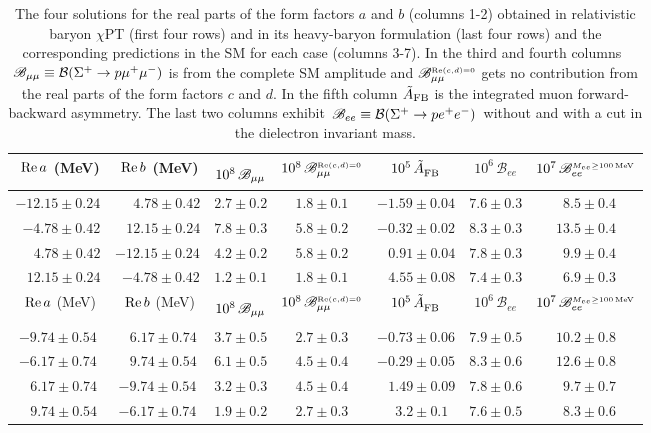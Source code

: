 \documentclass[amsmath,amssymb,aps,nofootinbib,prd,preprint,superscriptaddress,tightenlines,a4paper,bm]{revtex4-2}
\begin{document}
\begin{table}[b] \bigskip
\centering \setlength{\tabcolsep}{1ex}
\begin{tabular}{|cc||c|c|c|c|c|}\hline
$~ {\rm Re}\,a$ (MeV) & $~ {\rm Re}\,b$ (MeV) & $10^8\, {\mathscr B}_{\mu\mu}\vphantom{|_|^{\int}}$ &  $10^8\, {\mathscr B}_{\mu\mu}^{\scriptscriptstyle{\rm Re}(c,d)=0}$ & $10^5\, {\tilde A}_{\rm FB}^{}$ & $10^6\,\mathscr B_{ee}^{}$  & $10^7\, {\mathscr B}_{ee}^{\scriptscriptstyle M_{ee}\ge100\rm\,MeV}$ \\ \hline
$-12.15\pm0.24$ & ~~ $4.78\pm 0.42$ & $2.7\pm 0.2$ & $1.8\pm 0.1$ & $-1.59\pm0.04$& $7.6\pm 0.3$ & ~$8.5\pm0.4$
\\
~$-4.78\pm 0.42$ & ~ $12.15\pm0.24$ & $7.8\pm 0.3$ & $5.8\pm 0.2$ & $-0.32\pm0.02$& $8.3\pm0.3$ & $13.5\pm0.4$
\\
~~ $4.78\pm 0.42$  &  $-12.15\pm0.24$ & $4.2\pm 0.2$ & $5.8\pm 0.2$ & ~ $0.91\pm0.04$& $7.8\pm0.3$ & ~$9.9\pm0.4$
\\
~ $12.15\pm0.24$ & ~$-4.78\pm 0.42$& $1.2\pm 0.1$& $1.8\pm 0.1$ & ~ $4.55\pm0.08$& $7.4\pm0.3$ & ~$6.9\pm 0.3$
\\ \hline \hline
$~{\rm Re}\,a$ (MeV) & $~{\rm Re}\,b$ (MeV) & $10^8\, {\mathscr B}_{\mu\mu}\vphantom{|_|^{\int}}$ & $10^8\, {\mathscr B}_{\mu\mu}^{\scriptscriptstyle{\rm Re}(c,d)=0}$ & $10^5\, {\tilde A}_{\rm FB}^{}$ & $10^6\, \mathscr B_{ee}^{}$  & $10^7\, {\mathscr B}_{ee}^{\scriptscriptstyle M_{ee}\ge100\rm\,MeV}$
\\ \hline
$-9.74\pm0.54$  & ~ $6.17\pm 0.74$ & $3.7\pm 0.5$ & $2.7\pm 0.3$ & $-0.73\pm0.06$  & $7.9\pm 0.5$ & $10.2\pm0.8$
\\
$-6.17\pm 0.74$ & ~ $9.74\pm0.54$  & $6.1\pm0.5$ & $4.5\pm 0.4$  & $-0.29\pm0.05$  & $8.3\pm 0.6$ & $12.6\pm0.8$
\\
~ $6.17\pm 0.74$ &  $-9.74\pm0.54$ & $3.2\pm 0.3$& $4.5\pm 0.4$  & ~ $1.49\pm0.09$ & $7.8\pm 0.6$ & ~$9.7\pm0.7$
\\
~ $9.74\pm0.54$ & $-6.17\pm 0.74$  & $1.9\pm 0.2$ & $2.7\pm 0.3$ & ~ $3.2\pm0.1$   & $7.6\pm 0.5$ & ~$8.3\pm0.6$
\\ \hline
    \end{tabular}
\caption{The four solutions for the real parts of the form factors $a$ and $b$ (columns 1-2) obtained in relativistic baryon $\chi$PT (first four rows) and in its heavy-baryon formulation (last four rows) and the corresponding predictions in the SM for each case (columns 3-7).
In the third and fourth columns \,$\mathscr B_{\mu\mu}\equiv{\cal B}(\Sigma^+\to p\mu^+\mu^-)$ is from the complete SM amplitude and ${\mathscr B}_{\mu\mu}^{\scriptscriptstyle{\rm Re}(c,d)=0}$ gets no contribution from the real parts of the form factors $c$ and $d$.
In the fifth column $\tilde A_{\rm FB}$ is the integrated muon forward-backward asymmetry.
The last two columns exhibit \,$\mathscr B_{ee} \equiv {\cal B}(\Sigma^+\to p e^+e^-)$\, without and with a cut in the dielectron invariant mass.}  \label{tab:rates}
\end{table}
\end{document}
